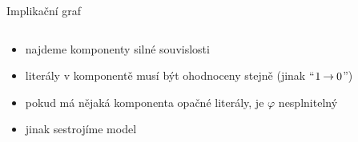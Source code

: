 \documentclass{beamer}
\begin{document}
\begin{frame}{Implikační graf}


    \medskip
    \vspace{-18pt}
    \begin{columns}
        \begin{column}{0.45\textwidth}
        
        \begin{itemize}
            \item najdeme komponenty silné souvislosti
            \item literály v komponentě musí být ohodnoceny stejně (jinak ``$1\mathbin{\rightarrow} 0$'')
            \item pokud má nějaká komponenta opačné literály, je $\varphi$ nesplnitelný
            \item jinak sestrojíme model
        \end{itemize}
        

\end{column}
\end{columns}
\end{frame}
\end{document}
